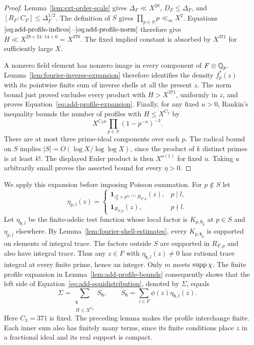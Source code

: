 \begin{proof}
Lemma~\ref{lem:ext-order-scale} gives
\(\Delta_F\ll X^{28}\),
\(D_F\le\Delta_F\), and
\([R_F:C_F]\le\Delta_F^{1/2}\).  The definition of \(S\) gives
\(\prod_{p\in S}p\ll_m X^2\).  Equations
\(\eqref{eq:add-profile-indices}\)--\(\eqref{eq:add-profile-norm}\) therefore
give \(H\ll X^{28+24\cdot14+6}=X^{370}\).  The fixed implied constant is
absorbed by \(X^{371}\) for sufficiently large \(X\).

A nonzero field element has nonzero image in every component of
\(F\otimes\mathbb Q_p\).  Lemma~\ref{lem:fourier-inverse-expansion} therefore
identifies the density \(f_p^*(z)\) with its pointwise finite sum of inverse
shells at all the present \(z\).  The norm bound just proved excludes every
product with \(H>X^{371}\), uniformly in \(z\), and proves
Equation~\eqref{eq:add-profile-expansion}.  Finally, for any fixed \(u>0\),
Rankin's inequality bounds the number of profiles with \(H\le X^{C_3}\) by
\[
 X^{C_3u}\prod_{p\in S}(1-p^{-u})^{-3}.
\]
There are at most three prime-ideal components over each \(p\).  The radical
bound on \(S\) implies \(|S|=O(\log X/\log\log X)\), since the product of
\(k\) distinct primes is at least \(k!\).  The displayed Euler product is
then \(X^{o(1)}\) for fixed \(u\).  Taking \(u\) arbitrarily small proves
the asserted bound for every \(\eta>0\).
\end{proof}

We apply this expansion before imposing Poisson summation.  For \(p\notin S\)
let
\[
 \eta_{p,l}(z)=
 \begin{cases}
  \mathbf 1_{z_p^0+p^{v_p(l)}R_{F,p}}(z),&p\mid l,\\
  \mathbf 1_{R_{F,p}}(z),&p\nmid l .
 \end{cases}
\]
Let \(\eta_{\mathfrak h,l}\) be the finite-adelic test function whose local
factor is \(K_{p,\mathfrak h_p}\) at \(p\in S\) and \(\eta_{p,l}\) elsewhere.
By Lemma~\ref{lem:fourier-shell-estimates}, every \(K_{p,\mathfrak h_p}\)
is supported on elements of integral trace.  The factors outside \(S\) are
supported in \(R_{F,p}\) and also have integral trace.  Thus any \(z\in F\)
with \(\eta_{\mathfrak h,l}(z)\ne0\) has rational trace integral at every
finite prime, hence an integer.  Only \(m\) meets \(\operatorname{supp}\chi\).  The finite
profile expansion in Lemma~\ref{lem:add-profile-bounds} consequently shows
that the left side of
Equation~\eqref{eq:add-equidistribution}, denoted by \(\Sigma\), equals
\begin{equation}
 \Sigma
   =\sum_{\substack{\mathfrak h\\H\le X^{C_3}}}
       S_{\mathfrak h},\qquad
 S_{\mathfrak h}
   =\sum_{z\in F}\phi(z)\eta_{\mathfrak h,l}(z).
 \label{eq:add-original-profiles}
\end{equation}
Here \(C_3=371\) is fixed.  The preceding lemma makes the profile interchange
finite.  Each inner sum also has finitely many terms, since its finite
conditions place \(z\) in a fractional ideal and its real support is compact.

